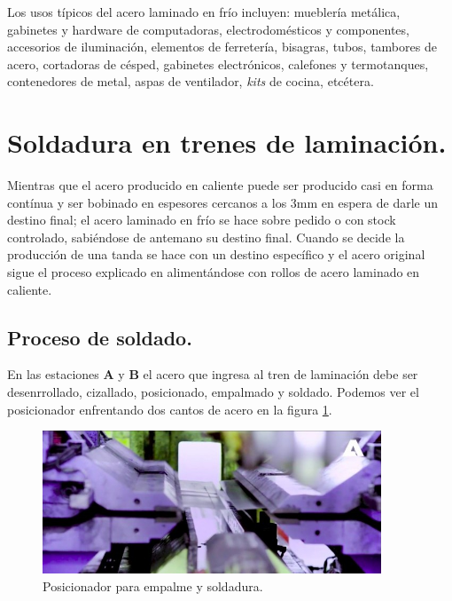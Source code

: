 Los usos típicos del acero laminado en frío incluyen: mueblería metálica, gabinetes y hardware de computadoras, electrodomésticos y componentes, accesorios de iluminación, elementos de ferretería, bisagras, tubos, tambores de acero, cortadoras de césped, gabinetes electrónicos, calefones y termotanques, contenedores de metal, aspas de ventilador, \textit{kits} de cocina, etcétera.



\section{Soldadura en trenes de laminación.}

Mientras que el acero producido en caliente puede ser producido casi en forma contínua y ser bobinado en espesores cercanos a los 3mm en espera de darle un destino final; el acero laminado en frío se hace sobre pedido o con stock controlado, sabiéndose de antemano su destino final. Cuando se decide la producción de una tanda se hace con un destino específico y el acero original sigue el proceso explicado en  alimentándose con rollos de acero laminado en caliente. 

\subsection{Proceso de soldado.}


En las estaciones \textbf{A} y \textbf{B} el acero que ingresa al tren de laminación debe ser desenrrollado, cizallado, posicionado, empalmado y soldado. Podemos ver el posicionador enfrentando dos cantos de acero en la figura \ref{fig:posicionador}. 

\begin{figure}[h]
	\centering
	\includegraphics[width=0.90\textwidth]{./Figures/posicionador01.jpg}
	\caption{Posicionador para empalme y soldadura\protect\footnotemark.}
	\label{fig:posicionador} 
\end{figure}


